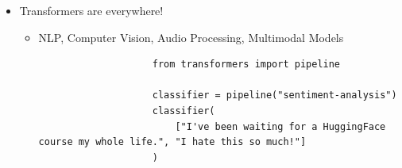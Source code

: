 \begin{itemize}[noitemsep]
\begin{itemize}[noitemsep]
\begin{itemize}[noitemsep]
                              \item Limitations:
                                    \begin{itemize}[noitemsep]
                                          \item Hallucinations
                                          \item Lack of true understanding
                                          \item Reflecting training data bias in outputs
                                          \item High computational and environmental costs
                                    \end{itemize}
                        \end{itemize}
            \end{itemize}
      \item Transformers are everywhere!
            \begin{itemize}[noitemsep]
                  \item NLP, Computer Vision, Audio Processing, Multimodal Models
                  \begin{lstlisting}
                    from transformers import pipeline

                    classifier = pipeline("sentiment-analysis")
                    classifier(
                        ["I've been waiting for a HuggingFace course my whole life.", "I hate this so much!"]
                    )


\end{lstlisting}
\end{itemize}
\end{itemize}

